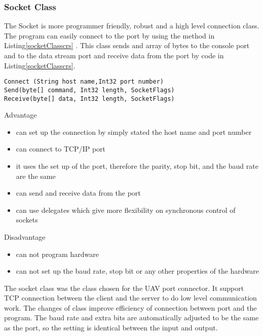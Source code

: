 \subsubsection{Socket Class}
The Socket is more programmer friendly, robust and a high level connection class. 
The program can easily connect to the port by using the method in Listing\ref{socketClasscrs} .
This class sends and array of bytes to the console port and to the data stream port and receive data from the port by code in Listing\ref{socketClasscrs}.

\begin{lstlisting}[caption=Socket class connect receive and send method,label=socketClasscrs]
Connect (String host name,Int32 port number)
Send(byte[] command, Int32 length, SocketFlags)
Receive(byte[] data, Int32 length, SocketFlags)
\end{lstlisting}

Advantage
\begin{itemize}
\item can set up the connection by simply stated the host name and port number
\item can connect to TCP/IP port 
\item it uses the set up of the port, therefore the parity, stop bit, and the baud rate are the same
\item can send and receive data from the port
\item can use delegates which give more flexibility on synchronous control of sockets \cite{robertH}
\end{itemize}
Disadvantage
\begin{itemize}
\item can not program hardware
\item can not set up the baud rate, stop bit or any other properties of the hardware
\end{itemize}

The socket class was the class chosen for the UAV port connector. 
It support TCP connection between the client and the server to do low level communication work\cite{xieX}. 
The changes of class improve efficiency of connection between port and the program. 
The baud rate and extra bits are automatically adjusted to be the same as the port, so the setting is identical between the input and output.
